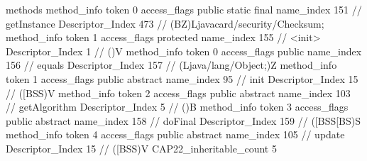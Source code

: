 {{{			methods {
				method_info {
					token	0
					access_flags	public static final
					name_index	151		// getInstance
					Descriptor_Index	473		// (BZ)Ljavacard/security/Checksum;
				}
				method_info {
					token	1
					access_flags	protected
					name_index	155		// <init>
					Descriptor_Index	1		// ()V
				}
				method_info {
					token	0
					access_flags	public
					name_index	156		// equals
					Descriptor_Index	157		// (Ljava/lang/Object;)Z
				}
				method_info {
					token	1
					access_flags	public abstract
					name_index	95		// init
					Descriptor_Index	15		// ([BSS)V
				}
				method_info {
					token	2
					access_flags	public abstract
					name_index	103		// getAlgorithm
					Descriptor_Index	5		// ()B
				}
				method_info {
					token	3
					access_flags	public abstract
					name_index	158		// doFinal
					Descriptor_Index	159		// ([BSS[BS)S
				}
				method_info {
					token	4
					access_flags	public abstract
					name_index	105		// update
					Descriptor_Index	15		// ([BSS)V
				}
			}
			CAP22_inheritable_count	5
		}
	}
}
